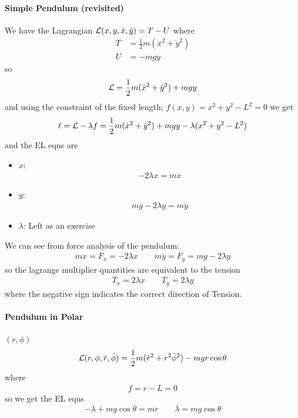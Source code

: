 \documentclass[../main.tex]{subfiles}
\begin{document}
\paragraph*{Simple Pendulum (revisited)} We have the Lagrangian
$\mathcal{L}(x, y, \dot x, \dot y) = T - U$ where 
\begin{align*}
    T &= \frac{1}{2} m (\dot x^2 + \dot y^2) \\
    U &= -mgy
\end{align*}
so
\begin{align*}
    \mathcal{L} = \frac{1}{2} m (\dot x^2 + \dot y^2) + mgy
\end{align*}
and using the constraint of the fixed length; $f(x, y) = x^2 + y^2 - L^2 = 0$ we get
\begin{align*}
    \ell = \mathcal{L} - \lambda f = \frac{1}{2} m (\dot x^2 + \dot y^2) + mgy - \lambda(x^2 + y^2 - L^2)
\end{align*}
and the EL eqns are
\begin{itemize}
    \item $x$:
    \begin{align*}
        -2\lambda x = m \ddot x
    \end{align*}
    \item $y$:
    \begin{align*}
        mg - 2\lambda y = m \ddot y
    \end{align*}
    \item $\lambda$: Left as an exercise
\end{itemize}
We can see from force analysis of the pendulum:
\begin{align*}
    m\ddot x = F_x = -2\lambda x \qquad m\ddot y = F_y = mg - 2\lambda y
\end{align*}
so the lagrange multiplier quantities are equivalent to the tension
\begin{align*}
    T_x = 2\lambda x \qquad T_y = 2\lambda y
\end{align*}
where the negative sign indicates the correct direction of Tension.

\paragraph*{Pendulum in Polar} $(r, \phi)$
\begin{align*}
    \mathcal{L}(r, \phi, \dot r, \dot \phi) = \frac{1}{2} m (\dot r^2 + r^2 \dot \phi^2) - mgr\cos\theta
\end{align*}
where
\begin{align*}
    f = r - L = 0
\end{align*}
so we get the EL eqns
\begin{align*}
    -\lambda + mg\cos\theta = m\ddot r \qquad \lambda = mg\cos\theta
\end{align*}
\end{document}
